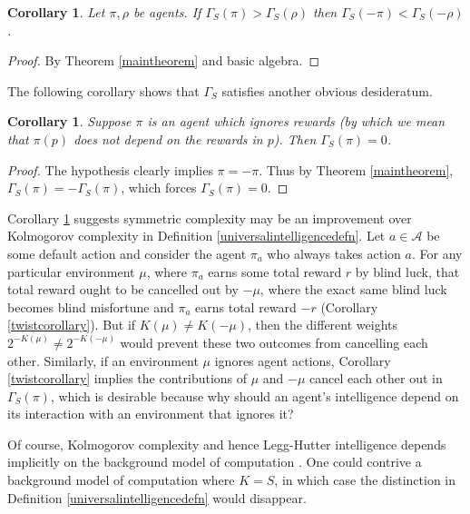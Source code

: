 \documentclass{article}
\newtheorem{corollary}[theorem]{Corollary}
\def\SYM{S}
\begin{document}
\begin{corollary}
\label{comparatorcorollary}
    Let $\pi,\rho$ be agents. If $\Gamma_{\SYM}(\pi)>\Gamma_{\SYM}(\rho)$
    then $\Gamma_{\SYM}(-\pi)<\Gamma_{\SYM}(-\rho)$.
\end{corollary}

\begin{proof}
    By Theorem \ref{maintheorem} and basic algebra.
\end{proof}

The following corollary shows that $\Gamma_{\SYM}$ satisfies another obvious
desideratum.

\begin{corollary}
\label{ignoringrewardscorollary}
    Suppose $\pi$ is an agent which ignores rewards (by which we mean that
    $\pi(p)$ does not depend on the rewards in $p$).
    Then $\Gamma_{\SYM}(\pi)=0$.
\end{corollary}

\begin{proof}
    The hypothesis clearly implies $\pi=-\pi$. Thus by Theorem
    \ref{maintheorem}, $\Gamma_{\SYM}(\pi)=-\Gamma_{\SYM}(\pi)$,
    which forces $\Gamma_{\SYM}(\pi)=0$.
\end{proof}

Corollary \ref{ignoringrewardscorollary} suggests
symmetric complexity may be an improvement over Kolmogorov complexity
in Definition \ref{universalintelligencedefn}.
Let $a\in\mathcal A$ be some default action and consider the
agent $\pi_a$ who always takes action $a$. For any particular environment $\mu$,
where $\pi_a$ earns some total reward $r$ by blind luck,
that total reward ought to be cancelled out by $-\mu$, where
the exact same blind luck becomes blind misfortune and $\pi_a$ earns total reward
$-r$ (Corollary \ref{twistcorollary}). But if $K(\mu)\not=K(-\mu)$,
then the different weights $2^{-K(\mu)}\not=2^{-K(-\mu)}$ would prevent
these two outcomes from cancelling each other. Similarly, if an environment
$\mu$ ignores agent actions, Corollary \ref{twistcorollary} implies
the contributions of $\mu$ and $-\mu$ cancel each other out in $\Gamma_{\SYM}(\pi)$,
which is desirable because why should an agent's intelligence depend on
its interaction with an environment that ignores it?

Of course, Kolmogorov complexity and hence Legg-Hutter intelligence depends
implicitly on the background model of computation \cite{leike2015bad}.
One could contrive a background model of computation where $K=S$,
in which case the distinction in
Definition \ref{universalintelligencedefn} would disappear.
\end{document}
